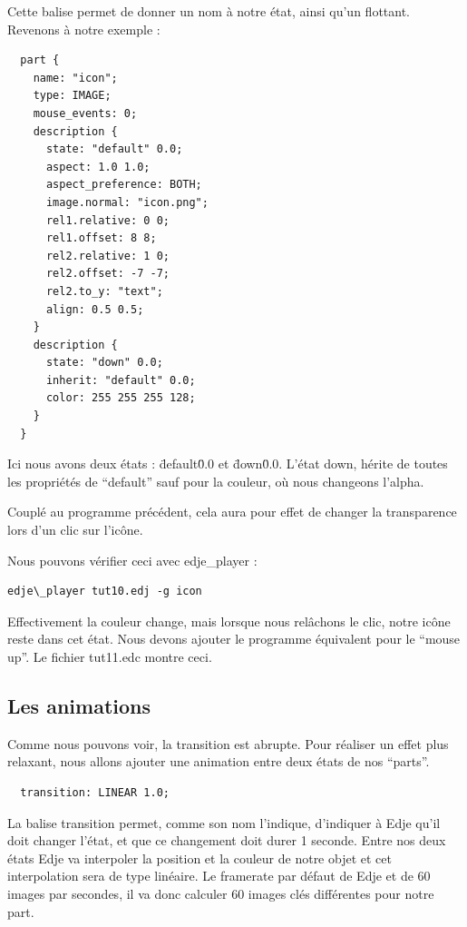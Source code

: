 \documentclass[a4paper]{efr}
\begin{document}
Cette balise permet de donner un nom à notre état, ainsi qu'un flottant.
Revenons à notre exemple :

\begin{lstlisting}
  part {
    name: "icon";
    type: IMAGE;
    mouse_events: 0;
    description {
      state: "default" 0.0;
      aspect: 1.0 1.0;
      aspect_preference: BOTH;
      image.normal: "icon.png";
      rel1.relative: 0 0;
      rel1.offset: 8 8;
      rel2.relative: 1 0;
      rel2.offset: -7 -7;
      rel2.to_y: "text";
      align: 0.5 0.5;
    }
    description {
      state: "down" 0.0;
      inherit: "default" 0.0;
      color: 255 255 255 128;
    }
  }
\end{lstlisting}

Ici nous avons deux états : \"default\" 0.0 et \"down\" 0.0.
L'état down, hérite de toutes les propriétés de ``default'' sauf pour la couleur, où
nous changeons l'alpha.

Couplé au programme précédent, cela aura pour effet de changer la transparence
lors d'un clic sur l'icône.

Nous pouvons vérifier ceci avec edje\_player :
\begin{lstlisting}
edje\_player tut10.edj -g icon
\end{lstlisting}

Effectivement la couleur change, mais lorsque nous relâchons le clic, notre
icône reste dans cet état. Nous devons ajouter le programme équivalent pour le
``mouse up''. Le fichier tut11.edc montre ceci.

\subsection{Les animations}

Comme nous pouvons voir, la transition est abrupte. Pour réaliser un effet plus
relaxant, nous allons ajouter une animation entre deux états de nos ``parts''.

\begin{lstlisting}
  transition: LINEAR 1.0;
\end{lstlisting}

La balise transition permet, comme son nom l'indique, d'indiquer à Edje qu'il
doit changer l'état, et que ce changement doit durer 1 seconde.
Entre nos deux états Edje va interpoler la position et la couleur de notre
objet et cet interpolation sera de type linéaire. Le framerate par défaut de
Edje et de 60 images par secondes, il va donc calculer 60 images clés différentes
pour notre part.
\end{document}
